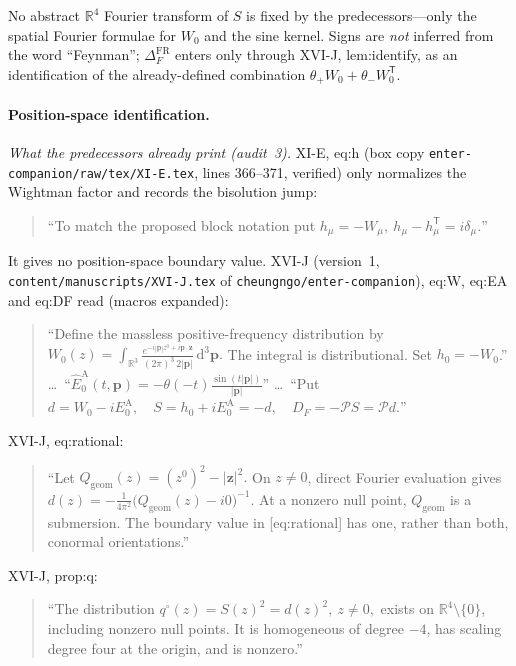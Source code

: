 \documentclass{article}
\theoremstyle{remark}
\begin{document}
No abstract $\mathbb R^4$ Fourier transform of $S$ is fixed by the predecessors---only the spatial Fourier formulae for $W_0$ and the sine kernel.
Signs are \emph{not} inferred from the word ``Feynman''; $\Delta_F^{\mathrm{FR}}$ enters only through XVI-J, lem:identify, as an identification of the already-defined combination $\theta_+W_0+\theta_-W_0^{\mathsf T}$.

\paragraph{Position-space identification.}
\label{sec:wpA-identify}
\emph{What the predecessors already print (audit~3).}
XI-E, eq:h (box copy \texttt{enter-companion/raw/tex/XI-E.tex}, lines 366--371, verified) only normalizes the Wightman factor and records the bisolution jump:
\begin{quote}\small
``To match the proposed block notation put
\(h_\mu=-W_\mu,\ h_\mu-h_\mu^{\mathsf T}=i\delta_\mu.\)''
\end{quote}
It gives no position-space boundary value.
XVI-J (version~1, \texttt{content/manuscripts/XVI-J.tex} of \texttt{cheungngo/enter-companion}), eq:W, eq:EA and eq:DF read (macros expanded):
\begin{quote}\small
``Define the massless positive-frequency distribution by
\(W_0(z)=\int_{\mathbb R^3}\frac{e^{-i|\mathbf p|z^0+i\mathbf p\cdot\mathbf z}}{(2\pi)^3\,2|\mathbf p|}\,\mathrm d^3\mathbf p.\)
The integral is distributional. Set \(h_0=-W_0\).''
\ldots\ ``\(\widehat E_0^{\mathrm A}(t,\mathbf p)=-\theta(-t)\frac{\sin(t|\mathbf p|)}{|\mathbf p|}\)'' \ldots\
``Put
\(d=W_0-iE_0^{\mathrm A},\quad S=h_0+iE_0^{\mathrm A}=-d,\quad D_F=-\mathcal PS=\mathcal Pd.\)''
\end{quote}
XVI-J, eq:rational:
\begin{quote}\small
``Let \(Q_{\mathrm{geom}}(z)=(z^0)^2-|\mathbf z|^2.\)
On \(z\ne0\), direct Fourier evaluation gives
\(d(z)=-\frac1{4\pi^2}\bigl(Q_{\mathrm{geom}}(z)-i0\bigr)^{-1}.\)
At a nonzero null point, \(Q_{\mathrm{geom}}\) is a submersion.
The boundary value in [eq:rational] has one, rather than both, conormal orientations.''
\end{quote}
XVI-J, prop:q:
\begin{quote}\small
``The distribution \(q^\circ(z)=S(z)^2=d(z)^2,\ z\ne0,\) exists on \(\mathbb R^4\setminus\{0\}\), including nonzero null points.
It is homogeneous of degree \(-4\), has scaling degree four at the origin, and is nonzero.''
\end{quote}
\end{document}
